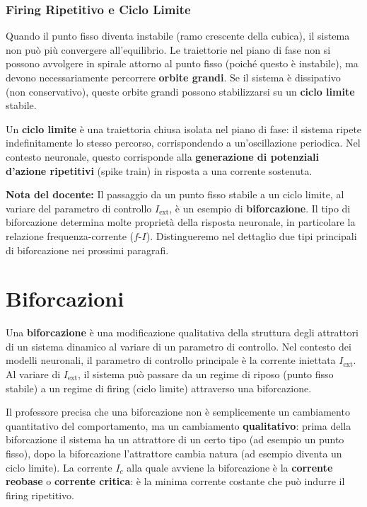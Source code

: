 \subsubsection{Firing Ripetitivo e Ciclo Limite}

Quando il punto fisso diventa instabile (ramo crescente della cubica), il sistema non può più convergere all'equilibrio. Le traiettorie nel piano di fase non si possono avvolgere in spirale attorno al punto fisso (poiché questo è instabile), ma devono necessariamente percorrere \textbf{orbite grandi}. Se il sistema è dissipativo (non conservativo), queste orbite grandi possono stabilizzarsi su un \textbf{ciclo limite} stabile.

Un \textbf{ciclo limite} è una traiettoria chiusa isolata nel piano di fase: il sistema ripete indefinitamente lo stesso percorso, corrispondendo a un'oscillazione periodica. Nel contesto neuronale, questo corrisponde alla \textbf{generazione di potenziali d'azione ripetitivi} (spike train) in risposta a una corrente sostenuta.

\begin{tcolorbox}[colback=gray!5, colframe=gray!40, arc=2mm, boxrule=0.5pt]
\textbf{Nota del docente:} Il passaggio da un punto fisso stabile a un ciclo limite, al variare del parametro di controllo $I_{\text{ext}}$, è un esempio di \textbf{biforcazione}. Il tipo di biforcazione determina molte proprietà della risposta neuronale, in particolare la relazione frequenza-corrente ($f$-$I$). Distingueremo nel dettaglio due tipi principali di biforcazione nei prossimi paragrafi.
\end{tcolorbox}


\section{Biforcazioni}


Una \textbf{biforcazione} è una modificazione qualitativa della struttura degli attrattori di un sistema dinamico al variare di un parametro di controllo. Nel contesto dei modelli neuronali, il parametro di controllo principale è la corrente iniettata $I_{\text{ext}}$. Al variare di $I_{\text{ext}}$, il sistema può passare da un regime di riposo (punto fisso stabile) a un regime di firing (ciclo limite) attraverso una biforcazione.

Il professore precisa che una biforcazione non è semplicemente un cambiamento quantitativo del comportamento, ma un cambiamento \textbf{qualitativo}: prima della biforcazione il sistema ha un attrattore di un certo tipo (ad esempio un punto fisso), dopo la biforcazione l'attrattore cambia natura (ad esempio diventa un ciclo limite). La corrente $I_c$ alla quale avviene la biforcazione è la \textbf{corrente reobase} o \textbf{corrente critica}: è la minima corrente costante che può indurre il firing ripetitivo.

